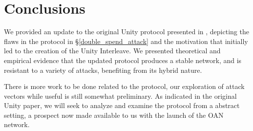 \section{Conclusions}

We provided an update to the original Unity protocol presented in \cite{wu2019unifying},
depicting the flaws in the protocol in \S\ref{double_spend_attack} and the motivation
that initially led to the creation of the Unity Interleave. We presented theoretical
and empirical evidence that the updated protocol produces a stable network, and is
resistant to a variety of attacks, benefiting from its hybrid nature.

There is more work to be done related to the protocol, our exploration of attack vectors
while useful is still somewhat preliminary. As indicated in the original Unity paper,
we will seek to analyze and examine the protocol from a abstract setting, a prospect
now made available to us with the launch of the OAN network.